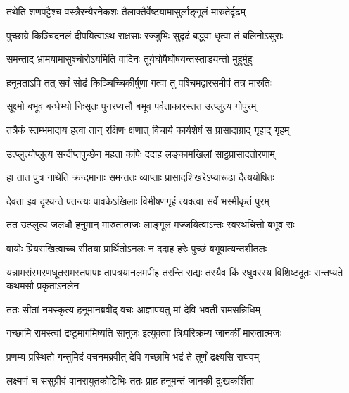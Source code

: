\twolineshloka
{तथेति शणपट्टैश्च वस्त्रैरन्यैरनेकशः}
{तैलाक्तैर्वेष्टयामासुर्लाङ्गूलं मारुतेर्दृढम्} %

\twolineshloka
{पुच्छाग्रे किञ्चिदनलं दीपयित्वाऽथ राक्षसाः}
{रज्जुभिः सुदृढं बद्\mbox{}ध्वा धृत्वा तं बलिनोऽसुराः} %

\twolineshloka
{समन्ताद् भ्रामयामासुश्चोरोऽयमिति वादिनः}
{तूर्यघोषैर्घोषयन्तस्ताडयन्तो मुहुर्मुहुः} %

\twolineshloka
{हनूमताऽपि तत् सर्वं सोढं किञ्चिच्चिकीर्षुणा}
{गत्वा तु पश्चिमद्वारसमीपं तत्र मारुतिः} %

\twolineshloka
{सूक्ष्मो बभूव बन्धेभ्यो निःसृतः पुनरप्यसौ}
{बभूव पर्वताकारस्तत उत्प्लुत्य गोपुरम्} %

\twolineshloka
{तत्रैकं स्तम्भमादाय हत्वा तान् रक्षिणः क्षणात्}
{विचार्य कार्यशेषं स प्रासादाग्राद् गृहाद् गृहम्} %

\twolineshloka
{उत्प्लुत्योप्लुत्य सन्दीप्तपुच्छेन महता कपिः}
{ददाह लङ्कामखिलां साट्टप्रासादतोरणाम्} %

\twolineshloka
{हा तात पुत्र नाथेति क्रन्दमानाः समन्ततः}
{व्याप्ताः प्रासादशिखरेऽप्यारूढा दैत्ययोषितः} %

\twolineshloka
{देवता इव दृश्यन्ते पतन्त्यः पावकेऽखिलाः}
{विभीषणगृहं त्यक्त्वा सर्वं भस्मीकृतं पुरम्} %

\twolineshloka
{तत उत्प्लुत्य जलधौ हनुमान् मारुतात्मजः}
{लाङ्गूलं मज्जयित्वाऽन्तः स्वस्थचित्तो बभूव सः} %

\twolineshloka
{वायोः प्रियसखित्वाच्च सीतया प्रार्थितोऽनलः}
{न ददाह हरेः पुच्छं बभूवात्यन्तशीतलः} %

\fourlineindentedshloka
{यन्नामसंस्मरणधूतसमस्तपापाः}
{तापत्रयानलमपीह तरन्ति सद्यः}
{तस्यैव किं रघुवरस्य विशिष्टदूतः}
{सन्तप्यते कथमसौ प्रकृताऽनलेन} %






\twolineshloka
{ततः सीतां नमस्कृत्य हनूमानब्रवीद् वचः}
{आज्ञापयतु मां देवि भवती रामसन्निधिम्} %

\twolineshloka
{गच्छामि रामस्त्वां द्रष्टुमागमिष्यति सानुजः}
{इत्युक्त्वा त्रिःपरिक्रम्य जानकीं मारुतात्मजः} %

\twolineshloka
{प्रणम्य प्रस्थितो गन्तुमिदं वचनमब्रवीत्}
{देवि गच्छामि भद्रं ते तूर्णं द्रक्ष्यसि राघवम्} %

\twolineshloka
{लक्ष्मणं च ससुग्रीवं वानरायुतकोटिभिः}
{ततः प्राह हनूमन्तं जानकी दुःखकर्शिता} %

